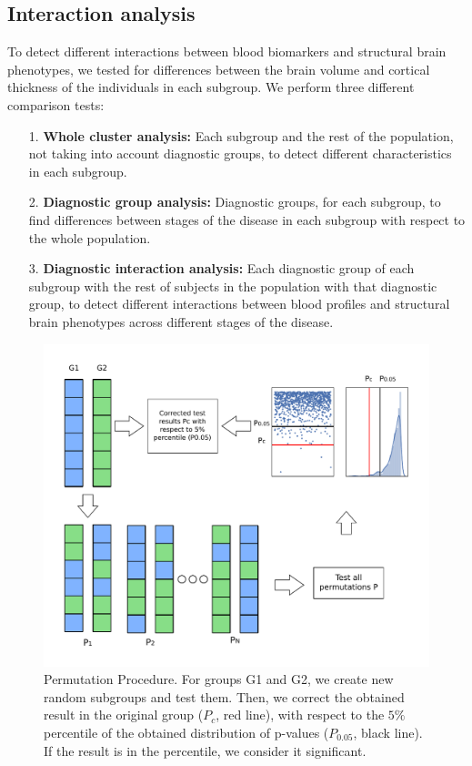 \subsection{Interaction analysis}

To detect different interactions between blood biomarkers and structural brain phenotypes, we tested for differences between the brain volume and cortical thickness of the individuals in each subgroup. We perform three different comparison tests:

\begin{itemize}
\item[1.] \textbf{Whole cluster analysis:} Each subgroup and the rest of the population, not taking into account diagnostic groups, to detect different characteristics in each subgroup.
\item[2.] \textbf{ Diagnostic group analysis:} Diagnostic groups, for each subgroup, to find differences between stages of the disease in each subgroup with respect to the whole population. %
\item[3.] \textbf{Diagnostic interaction analysis:} Each diagnostic group of each subgroup with the rest of subjects in the population with that diagnostic group, to detect different interactions between blood profiles and structural brain phenotypes across different stages of the disease.
\end{itemize}

\begin{figure}[!htbp]
\centering
\includegraphics[width=1.0\textwidth]{figures/cimlr/figure_2.pdf}
    \caption[Permutation procedure.]{Permutation Procedure. For groups G1 and G2, we create new random subgroups and test them. Then, we correct the obtained result in the original group ($P_c$, red line), with respect to the $5\%$ percentile of the obtained distribution of p-values ($P_{0.05}$, black line). If the result is in the percentile, we consider it significant.}
    \label{fig:permutation}
\end{figure}

